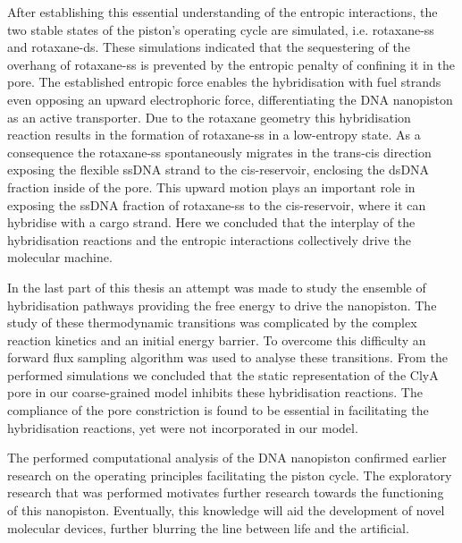 After establishing this essential understanding of the entropic interactions, the two
stable states of the piston's operating cycle are simulated, i.e. rotaxane-ss and
rotaxane-ds. These simulations indicated that the sequestering of the overhang of
rotaxane-ss is prevented by the entropic penalty of confining it in the pore.
The established entropic force enables the hybridisation with fuel strands even opposing
an upward electrophoric force, differentiating the DNA nanopiston as an active
transporter. Due to the rotaxane geometry this hybridisation reaction results in the
formation of rotaxane-ss in a low-entropy state. As a consequence the rotaxane-ss
spontaneously migrates in the trans-cis direction exposing the flexible ssDNA strand to
the cis-reservoir, enclosing the dsDNA fraction inside of the pore. This
upward motion plays an important role in exposing the ssDNA fraction of rotaxane-ss to
the cis-reservoir, where it can hybridise with a cargo strand. Here we concluded that
the interplay of the hybridisation reactions and the entropic interactions collectively
drive the molecular machine.

In the last part of this thesis an attempt was made to study the ensemble of
hybridisation pathways providing the free energy to drive the nanopiston. The study of
these thermodynamic transitions was complicated by the complex reaction kinetics and an
initial energy barrier. To overcome this difficulty an forward flux sampling algorithm
was used to analyse these transitions. From the performed simulations we concluded that
the static representation of the ClyA pore in our coarse-grained model inhibits these
hybridisation reactions. The compliance of the pore constriction is found to be essential
in facilitating the hybridisation reactions, yet were not incorporated in our model.

The performed computational analysis of the DNA nanopiston confirmed earlier research on
the operating principles facilitating the piston cycle. The exploratory research that was
performed motivates further research towards the functioning of this nanopiston.
Eventually, this knowledge will aid the development of novel molecular devices, further
blurring the line between life and the artificial.
